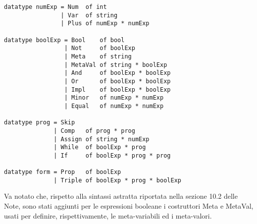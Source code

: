 \documentclass[]{article}
\begin{document}
\begin{center}
\begin{BVerbatim}
datatype numExp = Num  of int
                | Var  of string
                | Plus of numExp * numExp

datatype boolExp = Bool    of bool
                 | Not     of boolExp
                 | Meta    of string
                 | MetaVal of string * boolExp
                 | And     of boolExp * boolExp
                 | Or      of boolExp * boolExp
                 | Impl    of boolExp * boolExp
                 | Minor   of numExp * numExp
                 | Equal   of numExp * numExp

datatype prog = Skip
              | Comp   of prog * prog
              | Assign of string * numExp
              | While  of boolExp * prog
              | If     of boolExp * prog * prog

datatype form = Prop   of boolExp
              | Triple of boolExp * prog * boolExp
\end{BVerbatim}
\end{center}

Va notato che, rispetto alla sintassi astratta riportata nella sezione 10.2 delle Note, sono stati aggiunti per le espressioni booleane i costruttori Meta e MetaVal, usati per definire, rispettivamente, le meta-variabili ed i meta-valori. 
\end{document}
